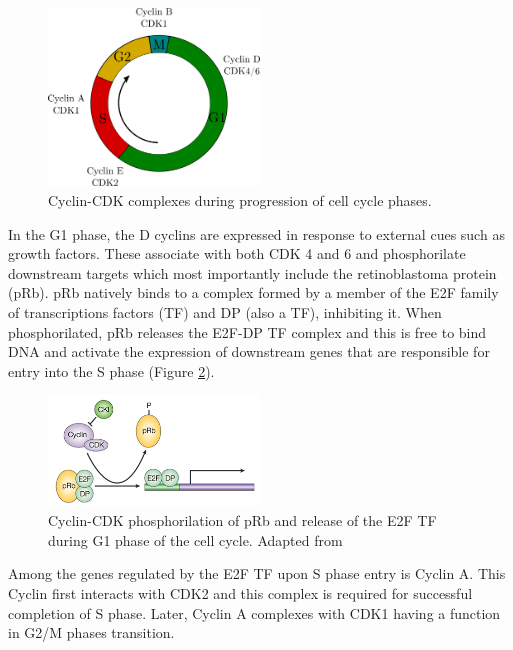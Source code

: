 \documentclass[11pt,twoside,a4paper]{report}
\begin{document}
				\begin{figure}[here]
					\centering
					\includegraphics[width=0.5\textwidth]{pngs/cell_cycle_complex.png}
					\caption{Cyclin-CDK complexes during progression of cell cycle phases.}
					\label{fig:cellcycle_complex}
				\end{figure}
								
				In the G1 phase, the D cyclins are expressed in response to external cues such as growth factors. These associate with both CDK 4 and 6 and phosphorilate downstream targets which most importantly include the retinoblastoma protein (pRb). pRb natively binds to a complex formed by a member of the E2F family of transcriptions factors (TF) and DP (also a TF), inhibiting it. When phosphorilated, pRb releases the E2F-DP TF complex and this is free to bind DNA and activate the expression of downstream genes that are responsible for entry into the S phase (Figure \ref{fig:pRb-E2F}).
				
				\begin{figure}[here]
					\centering
					\includegraphics[width=0.5\textwidth]{pngs/CDK-pRb-E2F-DP.png}
					\caption{Cyclin-CDK phosphorilation of pRb and release of the E2F TF during G1 phase of the cell cycle. {\footnotesize Adapted from \cite{Frisch2002}}}
					\label{fig:pRb-E2F}
				\end{figure}
				
				Among the genes regulated by the E2F TF upon S phase entry is Cyclin A. This Cyclin first interacts with CDK2 and this complex is required for successful completion of S phase. Later, Cyclin A complexes with CDK1 having a function in G2/M phases transition.
				
\end{document}
